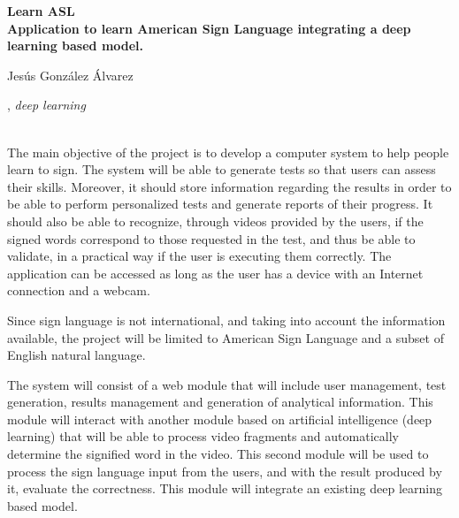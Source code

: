\thispagestyle{empty}

\begin{center}
{\large\bfseries Learn ASL \\ Application to learn American Sign Language integrating a deep learning based model.}\\
\end{center}
\begin{center}
Jesús González Álvarez\\
\end{center}


\vspace{0.5cm}
, \textit{deep learning}
\vspace{0.7cm}

\\

\bigskip
The main objective of the project is to develop a computer system to help people learn to sign. The system will be able to generate tests so that users can assess their skills. Moreover, it should store information regarding the results in order to be able to perform personalized tests and generate reports of their progress. It should also be able to recognize, through videos provided by the users, if the signed words correspond to those requested in the test, and thus be able to validate, in a practical way if the user is executing them correctly. The application can be accessed as long as the user has a device with an Internet connection and a webcam.

\bigskip
Since sign language is not international, and taking into account the information available, the project will be limited to American Sign Language and a subset of English natural language.

\bigskip
The system will consist of a web module that will include user management, test generation, results management and generation of analytical information. This module will interact with another module based on artificial intelligence (deep learning) that will be able to process video fragments and automatically determine the signified word in the video. This second module will be used to process the sign language input from the users, and with the result produced by it, evaluate the correctness. This module will integrate an existing deep learning based model.
	

